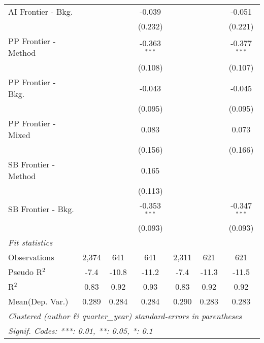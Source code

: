 \begin{tabular}{lcccccc}
   AI Frontier - Bkg.   &              &         & -0.039         &               &                & -0.051\\   
                        &              &         & (0.232)        &               &                & (0.221)\\   
   PP Frontier - Method &              &         & -0.363$^{***}$ &               &                & -0.377$^{***}$\\   
                        &              &         & (0.108)        &               &                & (0.107)\\   
   PP Frontier - Bkg.   &              &         & -0.043         &               &                & -0.045\\   
                        &              &         & (0.095)        &               &                & (0.095)\\   
   PP Frontier - Mixed  &              &         & 0.083          &               &                & 0.073\\   
                        &              &         & (0.156)        &               &                & (0.166)\\   
   SB Frontier - Method &              &         & 0.165          &               &                &   \\   
                        &              &         & (0.113)        &               &                &   \\   
   SB Frontier - Bkg.   &              &         & -0.353$^{***}$ &               &                & -0.347$^{***}$\\   
                        &              &         & (0.093)        &               &                & (0.093)\\   
   \midrule
   \emph{Fit statistics}\\
   Observations         & 2,374        & 641     & 641            & 2,311         & 621            & 621\\  
   Pseudo R$^2$         & -7.4         & -10.8   & -11.2          & -7.4          & -11.3          & -11.5\\  
   R$^2$                & 0.83         & 0.92    & 0.93           & 0.83          & 0.92           & 0.92\\  
Mean(Dep. Var.) & 0.289 & 0.284 & 0.284 & 0.290 & 0.283 & 0.283 \\
   \midrule \midrule
   \multicolumn{7}{l}{\emph{Clustered (author \& quarter\_year) standard-errors in parentheses}}\\
   \multicolumn{7}{l}{\emph{Signif. Codes: ***: 0.01, **: 0.05, *: 0.1}}\\
\end{tabular}
\par\endgroup
